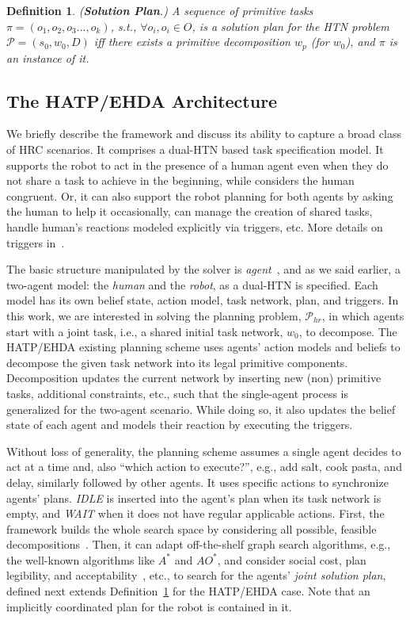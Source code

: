 \documentclass[letterpaper]{article} %
\newtheorem{definition}{Definition}
\begin{document}
\begin{definition} \label{def:htn-sol-plan}
(\textbf{Solution Plan}.) 
{A sequence of primitive tasks $\pi=(o_1,o_2,o_3...,o_k)$, s.t., $\forall o_i, o_i \in O$, is a solution plan for the HTN problem $\mathcal{P}=(s_0,w_0,D)$ iff there exists a primitive decomposition $w_p$ (for $w_0$), and $\pi$ is an instance of it. 
}  
\end{definition}

\subsection{The HATP/EHDA Architecture}
We briefly describe the framework and discuss its ability to capture a broad class of HRC scenarios. 
It comprises a dual-HTN based task specification model. It supports the robot to act in the presence of a human agent even when they do not share a task to achieve in the beginning, while considers the human congruent. 
Or, it can also support the robot planning for both agents by asking the human to help it occasionally, can manage the creation of shared tasks, handle human's reactions modeled explicitly via triggers, etc. More details on triggers  in~\cite{ingrand1996prs,AlamiCFGI98}.   

The basic structure manipulated by the solver is \textit{agent}~\cite{thesisBuisan21}, and as we said earlier, a two-agent model: the \textit{human} and the \textit{robot}, as a dual-HTN is specified. 
Each model has its own belief state, action model, task network, plan, and triggers. In this work, we are interested in solving the planning problem, $\mathcal{P}_{hr}$, in which agents start with a joint task, i.e., a shared initial task network, $w_0$, to decompose.
The HATP/EHDA existing planning scheme uses agents' action models and beliefs to decompose the given task network into its legal primitive components. 
Decomposition updates the current network by inserting new (non) primitive tasks, additional constraints, etc., such that the single-agent process is generalized for the two-agent scenario.
While doing so, it also updates the belief state of each agent and models their reaction by executing the triggers.

Without loss of generality, the planning scheme assumes a single agent decides to act at a time and, also ``which action to execute?'', e.g., add salt, cook pasta, and delay, similarly followed by other agents. 
It uses specific actions to synchronize agents' plans. {\em IDLE} is inserted into the agent's plan when its task network is empty, and {\em WAIT} when it does not have regular applicable actions. First, the framework builds the whole search space by considering all possible, feasible decompositions~\cite{buisan:hal-03684211}. 
Then, it can adapt off-the-shelf graph search algorithms, e.g., the well-known algorithms like $A^*$ and $AO^*$, and consider social cost, plan legibility, and acceptability~\cite{alili2009task}, etc., to search for the agents' \textit{joint solution plan}, defined next extends Definition~\ref{def:htn-sol-plan} for the HATP/EHDA case. Note that an implicitly coordinated plan for the robot is contained in it. 
\end{document}

